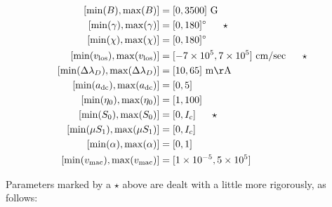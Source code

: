 \documentclass[11pt]{article}
\begin{document}
\begin{align}
\left[\mathrm{min}(B),\mathrm{max}(B)\right] &= [0,3500]\ \mathrm{G}\\
\left[\mathrm{min}(\gamma),\mathrm{max}(\gamma)\right] &= [0,180]^{\circ}\ \ \ \ \ \star\\
\left[\mathrm{min}(\chi),\mathrm{max}(\chi)\right] &= [0,180]^{\circ}\\
\left[\mathrm{min}(v_{\mathrm{los}}),\mathrm{max}(v_{\mathrm{los}})\right] &= [-7 \times 10^{5},7 \times 10^{5}]\ \mathrm{cm/sec}\ \ \ \ \ \star\\
\left[\mathrm{min}(\Delta\lambda_{D}),\mathrm{max}(\Delta\lambda_{D})\right] &= [10,65]\ \mathrm{m\AA}\\
\left[\mathrm{min}(a_{\mathrm{dc}}),\mathrm{max}(a_{\mathrm{dc}})\right] &= [0,5]\\
\left[\mathrm{min}(\eta_{0}),\mathrm{max}(\eta_{0})\right] &= [1,100]\\
\left[\mathrm{min}(S_{0}),\mathrm{max}(S_{0})\right] &= [0,I_{c}]\ \ \ \ \ \star\\
\left[\mathrm{min}(\mu S_{1}),\mathrm{max}(\mu S_{1})\right] &= [0,I_{c}]\\
\left[\mathrm{min}(\alpha),\mathrm{max}(\alpha)\right] &= [0,1]\\
\left[\mathrm{min}(v_{\mathrm{mac}}),\mathrm{max}(v_{\mathrm{mac}})\right] &= [1 \times 10^{-5},5 \times 10^{5}]
\end{align}

Parameters marked by a $\star$ above are dealt with a little more rigorously, as follows:
\end{document}

